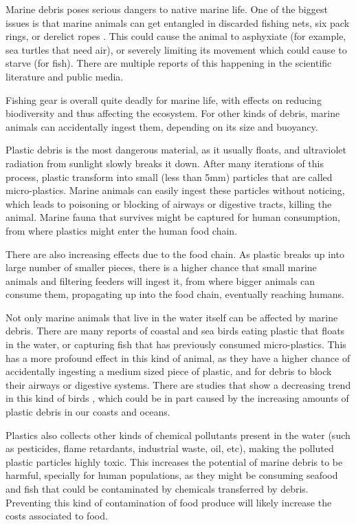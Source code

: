 Marine debris poses serious dangers to native marine life. One of the biggest issues is that marine animals can get entangled in discarded fishing nets, six pack rings, or derelict ropes \cite{laist1997impacts}. This could cause the animal to asphyxiate (for example, sea turtles that need air), or severely limiting its movement which could cause to starve (for fish). There are multiple reports of this happening in the scientific literature \cite[1em ]{gall2015impact} and public media.

Fishing gear is overall quite deadly for marine life, with effects on reducing biodiversity and thus affecting the ecosystem. For other kinds of debris, marine animals can accidentally ingest them, depending on its size and buoyancy.

Plastic debris is the most dangerous material, as it usually floats, and ultraviolet radiation from sunlight slowly breaks it down. After many iterations of this process, plastic transform into small (less than 5mm) particles that are called micro-plastics. Marine animals can easily ingest these particles without noticing\cite[-5em]{laist1987overview}, which leads to poisoning or blocking of airways or digestive tracts, killing the animal. Marine fauna that survives might be captured for human consumption, from where plastics might enter the human food chain.

There are also increasing effects due to the food chain. As plastic breaks up into large number of smaller pieces, there is a higher chance that small marine animals and filtering feeders will ingest it, from where bigger animals can consume them, propagating up into the food chain, eventually reaching humans.

Not only marine animals that live in the water itself can be affected by marine debris. There are many reports\cite{wilcox2015threat} of coastal and sea birds eating plastic that floats in the water, or capturing fish that has previously consumed micro-plastics. This has a more profound effect in this kind of animal, as they have a higher chance of accidentally ingesting a medium sized piece of plastic, and for debris to block their airways or digestive systems. There are studies that show a decreasing trend in this kind of birds \cite{paleczny2015population}, which could be in part caused by the increasing amounts of plastic debris in our coasts and oceans.

Plastics also collects other kinds of chemical pollutants present in the water (such as pesticides, flame retardants, industrial waste, oil, etc), making the polluted plastic particles highly toxic\cite{engler2012complex}. This increases the potential of marine debris to be harmful, specially for human populations, as they might be consuming seafood and fish that could be contaminated by chemicals transferred by debris. Preventing this kind of contamination of food produce will likely increase the costs associated to food.

